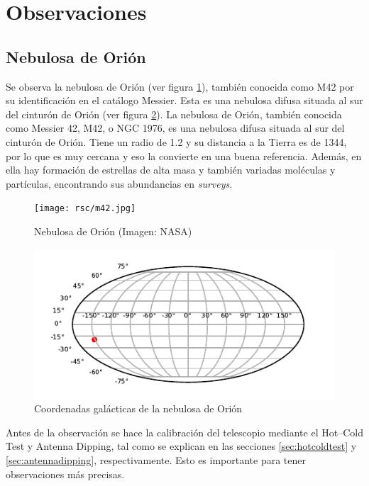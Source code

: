 \section{Observaciones}\label{sec:observaciones}

\subsection{Nebulosa de Orión}

Se observa la nebulosa de Orión (ver figura \ref{fig:m42}), también conocida como M42 por su identificación en el catálogo Messier. Esta es una nebulosa difusa situada al sur del cinturón de Orión (ver figura \ref{fig:lb}).
La nebulosa de Orión, también conocida como Messier 42, M42, o NGC 1976, es una nebulosa difusa situada al sur del cinturón de Orión. Tiene un radio de \SI{1.2}{\lightyear} y su distancia a la Tierra es de \SI{1344}{\lightyear}, por lo que es muy cercana y eso la convierte en una buena referencia. Además, en ella hay formación de estrellas de alta masa y también variadas moléculas y partículas, encontrando sus abundancias en \textit{surveys}.

\begin{figure}[p]
	\centering
	\texttt{[image: rsc/m42.jpg]}
	\caption{Nebulosa de Orión (Imagen: NASA)}
	\label{fig:m42}
\end{figure}

\begin{figure}[p]
	\centering
	\includegraphics{rsc/lb.pdf}
	\caption{Coordenadas galácticas de la nebulosa de Orión}
	\label{fig:lb}
\end{figure}

Antes de la observación se hace la calibración del telescopio mediante el Hot--Cold Test y Antenna Dipping, tal como se explican en las secciones \ref{sec:hotcoldtest} y \ref{sec:antennadipping}, respectivamente. Esto es importante para tener observaciones más precisas.

